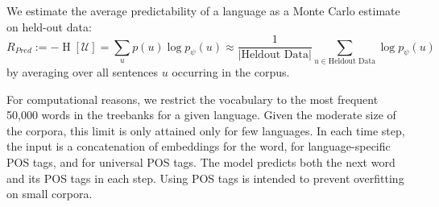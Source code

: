 \documentclass[10pt,twoside,lineno]{article}
\newcommand{\utterance}{\mathcal{U}}
\newcommand{\tree}{\mathcal{T}}
\begin{document}
We estimate the average predictability of a language as a Monte Carlo estimate on held-out data:
\begin{equation}
	R_{Pred} := - \operatorname{H}[\utterance] = \sum_{u} p(u) \log p_\psi(u) \approx \frac{1}{|\text{Heldout Data}|} \sum_{u \in \text{Heldout Data}} \log p_\psi(u)
\end{equation}
by averaging over all sentences $u$ occurring in the corpus.


For computational reasons, we restrict the vocabulary to the most frequent 50,000 words in the treebanks for a given language.
Given the moderate size of the corpora, this limit is only attained only for few languages.
In each time step, the input is a concatenation of embeddings for the word, for language-specific POS tags, and for universal POS tags.
The model predicts both the next word and its POS tags in each step.
Using POS tags is intended to prevent overfitting on small corpora.

\end{document}
